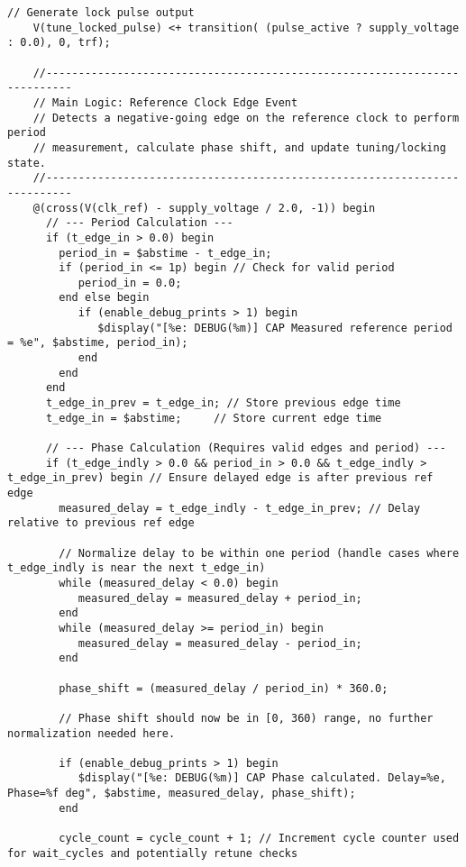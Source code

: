 \begin{lstlisting}[caption={Verilog-A Generic Capacitor Tuner Implementation}]
    // Generate lock pulse output
    V(tune_locked_pulse) <+ transition( (pulse_active ? supply_voltage : 0.0), 0, trf);

    //--------------------------------------------------------------------------
    // Main Logic: Reference Clock Edge Event
    // Detects a negative-going edge on the reference clock to perform period
    // measurement, calculate phase shift, and update tuning/locking state.
    //--------------------------------------------------------------------------
    @(cross(V(clk_ref) - supply_voltage / 2.0, -1)) begin
      // --- Period Calculation ---
      if (t_edge_in > 0.0) begin
        period_in = $abstime - t_edge_in;
        if (period_in <= 1p) begin // Check for valid period
           period_in = 0.0;
        end else begin
           if (enable_debug_prints > 1) begin
              $display("[%e: DEBUG(%m)] CAP Measured reference period = %e", $abstime, period_in);
           end
        end
      end
      t_edge_in_prev = t_edge_in; // Store previous edge time
      t_edge_in = $abstime;     // Store current edge time

      // --- Phase Calculation (Requires valid edges and period) ---
      if (t_edge_indly > 0.0 && period_in > 0.0 && t_edge_indly > t_edge_in_prev) begin // Ensure delayed edge is after previous ref edge
        measured_delay = t_edge_indly - t_edge_in_prev; // Delay relative to previous ref edge

        // Normalize delay to be within one period (handle cases where t_edge_indly is near the next t_edge_in)
        while (measured_delay < 0.0) begin
           measured_delay = measured_delay + period_in;
        end
        while (measured_delay >= period_in) begin
           measured_delay = measured_delay - period_in;
        end

        phase_shift = (measured_delay / period_in) * 360.0;

        // Phase shift should now be in [0, 360) range, no further normalization needed here.

        if (enable_debug_prints > 1) begin
           $display("[%e: DEBUG(%m)] CAP Phase calculated. Delay=%e, Phase=%f deg", $abstime, measured_delay, phase_shift);
        end

        cycle_count = cycle_count + 1; // Increment cycle counter used for wait_cycles and potentially retune checks


\end{lstlisting}
